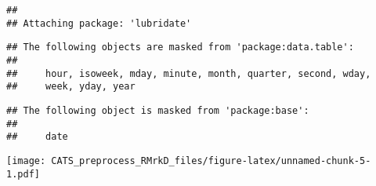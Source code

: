 \documentclass[]{article}
\newenvironment{Shaded}{\begin{snugshade}}{\end{snugshade}}
\newcommand{\KeywordTok}[1]{\textcolor[rgb]{0.13,0.29,0.53}{\textbf{{#1}}}}
\newcommand{\DataTypeTok}[1]{\textcolor[rgb]{0.13,0.29,0.53}{{#1}}}
\newcommand{\DecValTok}[1]{\textcolor[rgb]{0.00,0.00,0.81}{{#1}}}
\newcommand{\StringTok}[1]{\textcolor[rgb]{0.31,0.60,0.02}{{#1}}}
\newcommand{\NormalTok}[1]{{#1}}
\begin{document}
\begin{verbatim}
## 
## Attaching package: 'lubridate'
\end{verbatim}

\begin{verbatim}
## The following objects are masked from 'package:data.table':
## 
##     hour, isoweek, mday, minute, month, quarter, second, wday,
##     week, yday, year
\end{verbatim}

\begin{verbatim}
## The following object is masked from 'package:base':
## 
##     date
\end{verbatim}

\begin{Shaded}
\end{Shaded}

\texttt{[image: CATS\_preprocess\_RMrkD\_files/figure-latex/unnamed-chunk-5-1.pdf]}
\end{document}
